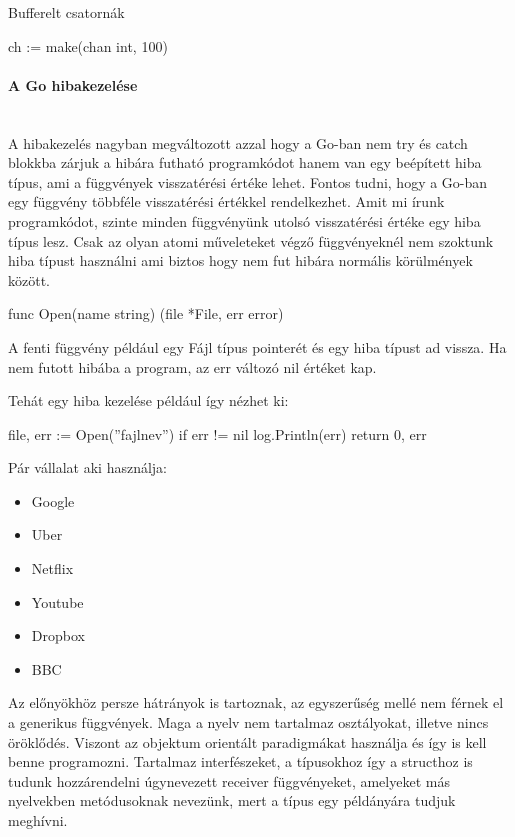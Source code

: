 Bufferelt csatornák
\begin{python}
    ch := make(chan int, 100)
\end{python}

\paragraph{A Go hibakezelése} \mbox{} \\
A hibakezelés nagyban megváltozott azzal hogy a Go-ban nem try és catch blokkba zárjuk a hibára futható programkódot
hanem van egy beépített hiba típus, ami a függvények visszatérési értéke lehet. Fontos tudni, hogy a Go-ban egy függvény többféle
visszatérési értékkel rendelkezhet. Amit mi írunk programkódot, szinte minden függvényünk utolsó visszatérési értéke egy hiba típus lesz.
Csak az olyan atomi műveleteket végző függvényeknél nem szoktunk hiba típust használni ami biztos hogy nem fut hibára normális körülmények között.
\begin{python}
    func Open(name string) (file *File, err error)
\end{python}
A fenti függvény például egy Fájl típus pointerét és egy hiba típust ad vissza. Ha nem futott hibába a program, az err változó nil értéket kap.

Tehát egy hiba kezelése például így nézhet ki:
\begin{python}
    file, err := Open(''fajlnev'')
    if err != nil {
    log.Println(err)
    return 0, err
    }
\end{python}



Pár vállalat aki használja:
\begin{itemize}
    \item Google %
    \item Uber %
    \item Netflix %
    \item Youtube %
    \item Dropbox %
    \item BBC %
\end{itemize}

Az előnyökhöz persze hátrányok is tartoznak, az egyszerűség mellé nem férnek el a generikus függvények.
Maga a nyelv nem tartalmaz osztályokat, illetve nincs öröklődés.
Viszont az objektum orientált paradigmákat használja és így is kell benne programozni.
Tartalmaz interfészeket, a típusokhoz így a structhoz is tudunk hozzárendelni úgynevezett receiver függvényeket, amelyeket más nyelvekben metódusoknak nevezünk, mert a típus egy példányára tudjuk meghívni.

